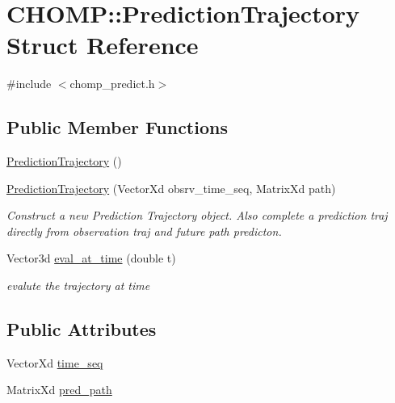 \hypertarget{struct_c_h_o_m_p_1_1_prediction_trajectory}{}\section{C\+H\+O\+MP\+:\+:Prediction\+Trajectory Struct Reference}
\label{struct_c_h_o_m_p_1_1_prediction_trajectory}


{\ttfamily \#include $<$chomp\+\_\+predict.\+h$>$}

\subsection*{Public Member Functions}
\begin{DoxyCompactItemize}
\item 
\hyperlink{struct_c_h_o_m_p_1_1_prediction_trajectory_a51c4006f1e9ba69099e06b9052a14a1d}{Prediction\+Trajectory} ()
\item 
\hyperlink{struct_c_h_o_m_p_1_1_prediction_trajectory_afab886899c7e147618a3da0f02c3ac00}{Prediction\+Trajectory} (Vector\+Xd obsrv\+\_\+time\+\_\+seq, Matrix\+Xd path)
\begin{DoxyCompactList}\small\item\em Construct a new Prediction Trajectory object. Also complete a prediction traj directly from observation traj and future path predicton. \end{DoxyCompactList}\item 
Vector3d \hyperlink{struct_c_h_o_m_p_1_1_prediction_trajectory_a3074031665bc857a9482849679fed32f}{eval\+\_\+at\+\_\+time} (double t)
\begin{DoxyCompactList}\small\item\em evalute the trajectory at time \end{DoxyCompactList}\end{DoxyCompactItemize}
\subsection*{Public Attributes}
\begin{DoxyCompactItemize}
\item 
Vector\+Xd \hyperlink{struct_c_h_o_m_p_1_1_prediction_trajectory_ae8b2997764b253ed927a7f24cea9a9fe}{time\+\_\+seq}
\item 
Matrix\+Xd \hyperlink{struct_c_h_o_m_p_1_1_prediction_trajectory_af07e1c23267f79f9e7ec029bcbb246b8}{pred\+\_\+path}
\end{DoxyCompactItemize}


